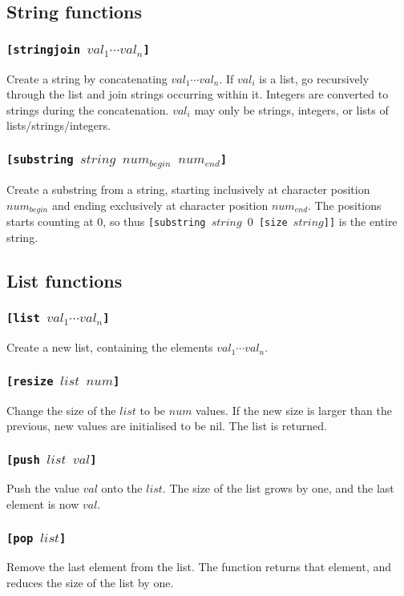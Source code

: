 \subsection{String functions}
\subsubsection{\tt{[stringjoin }$val_1\cdots val_n$\tt{]}}
Create a string by concatenating $val_1\cdots val_n$.
If $val_i$ is a list, go recursively through the list and join strings occurring within it. Integers are converted to strings during the concatenation. $val_i$ may only be strings, integers, or lists of lists/strings/integers.
\subsubsection{\tt{[substring }$string$ $num_{begin}$ $num_{end}$\tt{]}}
Create a substring from a string, starting inclusively at character position $num_{begin}$ and ending exclusively at character position $num_{end}$. The positions starts counting at $0$, so thus {\tt{[substring }$string$ $0$ \tt{[size }$string$\tt{]]}} is the entire string.

\subsection{List functions}
\subsubsection{\tt{[list }$val_1\cdots val_n$\tt{]}}
Create a new list, containing the elements $val_1\cdots val_n$.

\subsubsection{\tt{[resize }$list$ $num$\tt{]}}
Change the size of the $list$ to be $num$ values. If the new size is larger than the previous, new values are initialised to be nil. The list is returned.

\subsubsection{\tt{[push }$list$ $val$\tt{]}}
Push the value $val$ onto the $list$. The size of the list grows by one, and the last element is now $val$.

\subsubsection{\tt{[pop }$list$\tt{]}}
Remove the last element from the list. The function returns that element, and reduces the size of the list by one.

